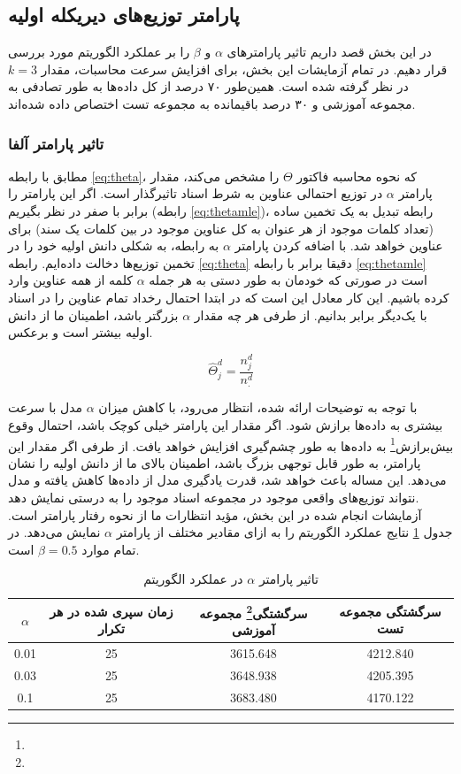 \documentclass[11.5pt,a4paper]{article}
\newcommand{\enfootnote}[1]{\footnote{\lr{#1}}}
\begin{document}
\subsection{پارامتر توزیع‌های دیریکله اولیه}

در این بخش قصد داریم تاثیر پارامترهای $\alpha$ و $\beta$ را بر عملکرد الگوریتم مورد بررسی قرار دهیم. در تمام آزمایشات این بخش، برای افزایش سرعت محاسبات، مقدار $k = 3$ در نظر گرفته شده است. همین‌طور ۷۰ درصد از کل داده‌ها به طور تصادفی به مجموعه آموزشی و ۳۰ درصد باقیمانده به مجموعه تست اختصاص داده‌ شده‌اند.

\subsubsection{تاثیر پارامتر آلفا}
مطابق با رابطه \ref{eq:theta}، که نحوه محاسبه فاکتور $\Theta$ را مشخص می‌کند، مقدار پارامتر $\alpha$ در توزیع احتمالی عناوین به شرط اسناد تاثیرگذار است. اگر این پارامتر را برابر با صفر در نظر بگیریم (رابطه \ref{eq:thetamle})، رابطه تبدیل به یک تخمین  ساده (تعداد کلمات موجود از هر عنوان به کل عناوین موجود در بین کلمات یک سند) برای عناوین خواهد شد. با اضافه کردن پارامتر $\alpha$ به رابطه، به شکلی دانش اولیه خود را در تخمین توزیع‌ها دخالت داده‌ایم. رابطه \ref{eq:theta} دقیقا برابر با رابطه \ref{eq:thetamle} است در صورتی که خودمان به طور دستی به هر جمله $\alpha$ کلمه از همه عناوین وارد کرده باشیم. این کار معادل این است که در ابتدا احتمال رخداد تمام عناوین را در اسناد با یک‌دیگر برابر بدانیم. از طرفی هر چه مقدار $\alpha$ بزرگتر باشد، اطمینان ما از دانش اولیه بیشتر است و برعکس.

\begin{equation}
\hat{\Theta}_{j}^{d} = \frac{n_j^d }{n_{.}^d}
\label{eq:thetamle}
\end{equation}

با توجه به توضیحات ارائه شده، انتظار می‌رود، با کاهش میزان $\alpha$ مدل با سرعت بیشتری به داده‌ها برازش شود. اگر مقدار این پارامتر خیلی کوچک باشد، احتمال وقوع بیش‌برازش\enfootnote{Overfit} به داده‌ها به طور چشم‌گیری افزایش خواهد یافت. از طرفی اگر مقدار این پارامتر، به طور قابل توجهی بزرگ باشد، اطمینان بالای ما از دانش اولیه را نشان می‌دهد. این مساله باعث خواهد شد، قدرت یادگیری مدل از داده‌ها کاهش یافته و مدل نتواند توزیع‌های واقعی موجود در مجموعه اسناد موجود را به درستی نمایش دهد.
\\

آزمایشات انجام شده در این بخش، مؤید انتظارات ما از نحوه رفتار پارامتر است. جدول \ref{tbl:alpha}
نتایج عملکرد الگوریتم را به ازای مقادیر مختلف از پارامتر $\alpha$ نمایش می‌دهد. در تمام موارد $\beta = 0.5$ است.
\begin{table}[h]
\center
\caption{تاثیر پارامتر $\alpha$ در عملکرد الگوریتم}
\label{tbl:alpha}
\begin{tabular}{c | c | c | c}
$\alpha$ & زمان سپری شده در هر تکرار & سرگشتگی\enfootnote{Perplexity} مجموعه آموزشی & سرگشتگی مجموعه تست\\
\hline
\hline
0.01 & 25 & 3615.648 & 4212.840 \\
0.03 & 25 & 3648.938 & 4205.395 \\
0.1 & 25 & 3683.480 & 4170.122 \\
\end{tabular}
\end{table}
\end{document}
